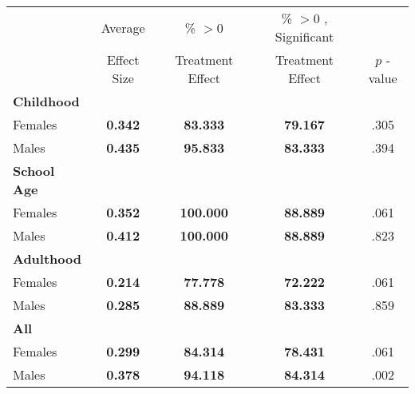 \begin{tabular}{l c c c c}
\toprule
 & Average & \% $ >0 $ & \% $ >0 $ , Significant & \citet{Rosenbaum_2005_Distribution_JRSS} \\
 & Effect Size & Treatment Effect & Treatment Effect & $ p $ -value \\
\midrule
\textbf{Childhood} & & & & \\
\quad Females &  \textbf{    0.342} & \textbf{   83.333} & \textbf{   79.167} & .305 \\
\quad Males &  \textbf{    0.435} & \textbf{   95.833} & \textbf{   83.333} & .394 \\
\midrule
\textbf{School Age} & & & & \\
\quad Females &  \textbf{    0.352} & \textbf{  100.000} & \textbf{   88.889} & .061 \\
\quad Males &  \textbf{    0.412} & \textbf{  100.000} & \textbf{   88.889} & .823 \\
\midrule
\textbf{Adulthood} & & & & \\
\quad Females &  \textbf{    0.214} & \textbf{   77.778} & \textbf{   72.222} & .061 \\
\quad Males &  \textbf{    0.285} & \textbf{   88.889} & \textbf{   83.333} & .859 \\
\midrule
\textbf{All} & & & & \\
\quad Females &  \textbf{    0.299} & \textbf{   84.314} & \textbf{   78.431} & .061 \\
\quad Males &  \textbf{    0.378} & \textbf{   94.118} & \textbf{   84.314} & .002 \\
\bottomrule
\end{tabular}
